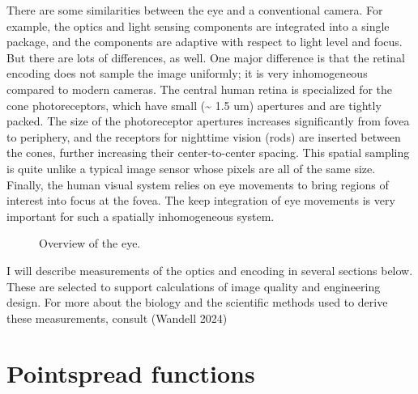 \documentclass[
  letterpaper,
]{book}
\begin{document}
There are some similarities between the eye and a conventional camera.
For example, the optics and light sensing components are integrated into
a single package, and the components are adaptive with respect to light
level and focus. But there are lots of differences, as well. One major
difference is that the retinal encoding does not sample the image
uniformly; it is very inhomogeneous compared to modern cameras. The
central human retina is specialized for the cone photoreceptors, which
have small (\textasciitilde{} 1.5 um) apertures and are tightly packed.
The size of the photoreceptor apertures increases significantly from
fovea to periphery, and the receptors for nighttime vision (rods) are
inserted between the cones, further increasing their center-to-center
spacing. This spatial sampling is quite unlike a typical image sensor
whose pixels are all of the same size. Finally, the human visual system
relies on eye movements to bring regions of interest into focus at the
fovea. The keep integration of eye movements is very important for such
a spatially inhomogeneous system.

\begin{figure}


\caption{\label{fig-retina-color}Overview of the eye.}

\end{figure}%

I will describe measurements of the optics and encoding in several
sections below. These are selected to support calculations of image
quality and engineering design. For more about the biology and the
scientific methods used to derive these measurements, consult (Wandell
2024)

\section{Pointspread functions}\label{pointspread-functions}
\end{document}
